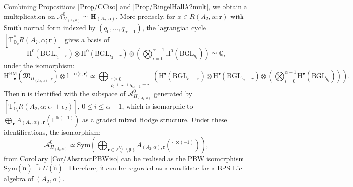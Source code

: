 \documentclass[11pt,english]{article}
\numberwithin{equation}{section}
\numberwithin{figure}{section}
\theoremstyle{definition}
\theoremstyle{plain}
\theoremstyle{remark}
\newcommand\rr{\mathbf{r}}
\newcommand\HH{\mathrm{H}}
\newcommand\ZZ{\mathbb{Z}}
\newcommand\QQ{\mathbb{Q}}
\begin{document}
Combining Propositions \ref{Prop/CCiso} and \ref{Prop/RingelHallA2mult},
we obtain a multiplication on $\mathcal{A}_{\Pi_{(A_{2},\alpha)}}^{0}\simeq\mathbf{H}_{(A_{2},\alpha)}$.
More precisely, for $x\in R(A_{2},\alpha;\rr)$ with Smith normal
form indexed by $(q_{0},\ldots,q_{\alpha-1})$, the lagrangian cycle
$[\overline{\mathrm{T}_{\mathbb{O}_{x}}^{*}R(A_{2},\alpha;\rr)}]$
gives a basis of\[
\HH^{0}(\mathrm{BGL}_{r_{1}-r})\otimes\HH^{0}(\mathrm{BGL}_{r_{2}-r})\otimes\left(\bigotimes_{i=0}^{\alpha-1}\HH^{0}(\mathrm{BGL}_{q_{i}})\right)\simeq\QQ
,
\]under the isomorphism:\[
\HH_{-\bullet}^{\mathrm{BM}}\left(\mathfrak{M}_{\Pi_{(A_{2},\alpha)},\rr}\right)\otimes\mathbb{L}^{-\alpha\langle\rr,\rr\rangle}
\simeq
\bigoplus_{\substack{r\geq0 \\ q_0+\ldots+q_{\alpha-1}=r}}
\left(
\HH^{\bullet}(\mathrm{BGL}_{r_1-r})\otimes\HH^{\bullet}(\mathrm{BGL}_{r_2-r})\otimes\left(\bigotimes_{i=0}^{\alpha-1}\HH^{\bullet}(\mathrm{BGL}_{q_i})\right)
\right)
.
\]Then $\tilde{\mathfrak{n}}$ is identified with the subspace of $\mathcal{A}_{\Pi_{(A_{2},\alpha)}}^{0}$
generated by $[\overline{\mathrm{T}_{\mathbb{O}_{i}}^{*}R(A_{2},\alpha;\epsilon_{1}+\epsilon_{2})}]$,
$0\leq i\leq\alpha-1$, which is isomorphic to $\bigoplus_{\rr}A_{(A_{2},\alpha),\rr}(\mathbb{L}^{\otimes(-1)})$
as a graded mixed Hodge structure. Under these identifications, the
isomorphism:\[
\mathcal{A}_{\Pi_{(A_2,\alpha)}}^0
\simeq
\mathrm{Sym}\left(\bigoplus_{\rr\in\ZZ_{\geq0}^{Q_0}\setminus\{0\}}A_{(A_2,\alpha),\rr}(\mathbb{L}^{\otimes (-1)})\right),
\] from Corollary \ref{Cor/AbstractPBWiso} can be realised as the PBW
isomorphism $\mathrm{Sym}(\tilde{\mathfrak{n}})\overset{\sim}{\longrightarrow}U(\tilde{\mathfrak{n}})$.
Therefore, $\tilde{\mathfrak{n}}$ can be regarded as a candidate
for a BPS Lie algebra of $(A_{2},\alpha)$.
\end{document}
